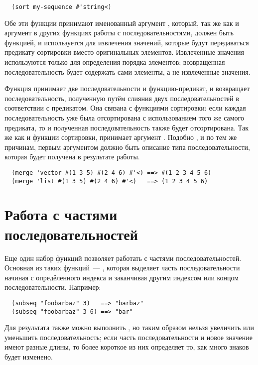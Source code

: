 \begin{verbatim}
  (sort my-sequence #'string<)
\end{verbatim}

Обе эти функции принимают именованный аргумент , который, так же как и аргумент
 в других функциях работы с последовательностями, должен быть функцией, и
используется для извлечения значений, которые будут передаваться предикату сортировки
вместо оригинальных элементов.  Извлеченные значения используются только для определения
порядка элементов; возвращенная последовательность будет содержать сами элементы, а не
извлеченные значения.

Функция  принимает две последовательности и функцию-предикат, и возвращает
последовательность, полученную путём слияния двух последовательностей в соответствии с
предикатом.  Она связана с функциями сортировки: если каждая последовательность
уже была отсортирована с использованием того же самого предиката, то и полученная
последовательность также будет отсортирована.  Так же как и функции сортировки,
 принимает аргумент .  Подобно , и по тем же
причинам, первым аргументом  должно быть описание типа последовательности,
которая будет получена в результате работы.

\begin{verbatim}
  (merge 'vector #(1 3 5) #(2 4 6) #'<) ==> #(1 2 3 4 5 6)
  (merge 'list #(1 3 5) #(2 4 6) #'<)   ==> (1 2 3 4 5 6)
\end{verbatim}

\section{Работа с частями последовательностей}

Еще один набор функций позволяет работать с частями последовательностей.  Основная из
таких функций~--- , которая выделяет часть последовательности
начиная с опредёленного индекса и заканчивая другим индексом или концом
последовательности.  Например:

\begin{verbatim}
  (subseq "foobarbaz" 3)   ==> "barbaz"
  (subseq "foobarbaz" 3 6) ==> "bar"
\end{verbatim}

Для результата  также можно выполнить , но таким образом нельзя увеличить
или уменьшить последовательность; если часть последовательности и новое значение имеют
разные длины, то более короткое из них определяет то, как много знаков будет изменено.

